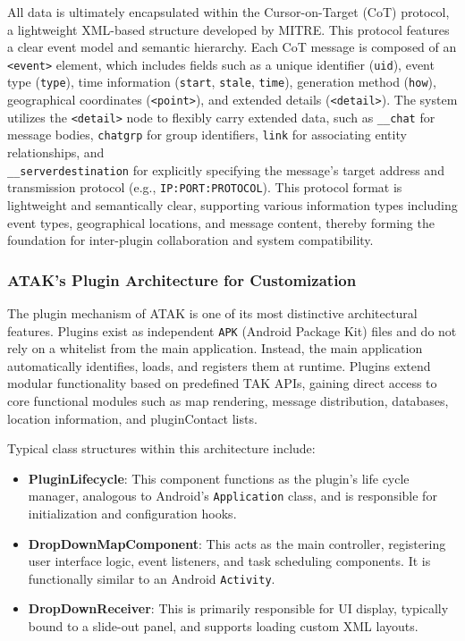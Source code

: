 All data is ultimately encapsulated within the Cursor-on-Target (CoT) protocol, a lightweight XML-based structure developed by MITRE. This protocol features a clear event model and semantic hierarchy. Each CoT message is composed of an \texttt{<event>} element, which includes fields such as a unique identifier (\texttt{uid}), event type (\texttt{type}), time information (\texttt{start}, \texttt{stale}, \texttt{time}), generation method (\texttt{how}), geographical coordinates (\texttt{<point>}), and extended details (\texttt{<detail>}). The system utilizes the \texttt{\textless detail\textgreater} node to flexibly carry extended data, such as \texttt{\_\_chat} for message bodies, \texttt{chatgrp} for group identifiers, \texttt{link} for associating entity relationships,  and \\\texttt{\_\_serverdestination} for explicitly specifying the message's target address and transmission protocol (e.g., \texttt{IP:PORT:PROTOCOL}). This protocol format is lightweight and semantically clear, supporting various information types including event types, geographical locations, and message content, thereby forming the foundation for inter-plugin collaboration and system compatibility.

\subsubsection{ATAK's Plugin Architecture for Customization}
The plugin mechanism of ATAK is one of its most distinctive architectural features. Plugins exist as independent \texttt{APK} (Android Package Kit) files and do not rely on a whitelist from the main application. Instead, the main application automatically identifies, loads, and registers them at runtime. Plugins extend modular functionality based on predefined TAK APIs, gaining direct access to core functional modules such as map rendering, message distribution, databases, location information, and pluginContact lists.

Typical class structures within this architecture include:

\begin{itemize}
  \item \textbf{PluginLifecycle}: This component functions as the plugin's life cycle manager, analogous to Android's \texttt{Application} class, and is responsible for initialization and configuration hooks.

  \item \textbf{DropDownMapComponent}: This acts as the main controller, registering user interface logic, event listeners, and task scheduling components. It is functionally similar to an Android \texttt{Activity}.

  \item \textbf{DropDownReceiver}: This is primarily responsible for UI display, typically bound to a slide-out panel, and supports loading custom XML layouts.
\end{itemize}

